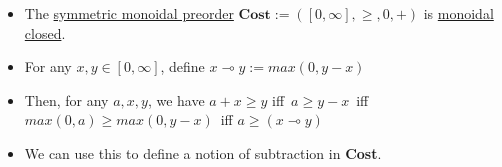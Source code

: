 \begin{itemize}
    \item The \hyperref[D2.2]{symmetric monoidal preorder} $\mathbf{Cost}:=([0,\infty],\geq,0,+)$ is \hyperref[D2.79]{monoidal closed}.
    \item For any $x,y \in [0,\infty]$, define $x \multimap y := max(0,y-x)$
    \item Then, for any $a,x,y$, we have $a+x\geq y$ iff \,$a \geq y-x$\, iff \,$max(0,a)\geq max(0,y-x)$\, iff $a \geq (x \multimap y)$
    \item We can use this to define a notion of subtraction in \textbf{Cost}.
  \end{itemize}